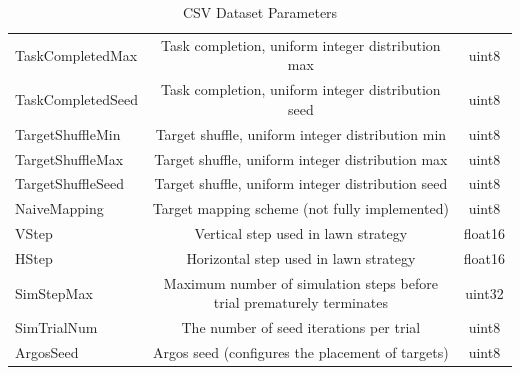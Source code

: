\documentclass{report}
\begin{document}
\begin{appendices}
\begin{table}
\begin{center}
\begin{tabular}{|l|c|c|}
			TaskCompletedMax & Task completion, uniform integer distribution max & uint8 \\
			TaskCompletedSeed & Task completion, uniform integer distribution seed & uint8 \\
			TargetShuffleMin & Target shuffle, uniform integer distribution min & uint8 \\
			TargetShuffleMax & Target shuffle, uniform integer distribution max & uint8 \\
			TargetShuffleSeed & Target shuffle, uniform integer distribution seed & uint8 \\
			NaiveMapping & Target mapping scheme (not fully implemented) & uint8 \\
			VStep & Vertical step used in lawn strategy & float16 \\
			HStep & Horizontal step used in lawn strategy & float16 \\
			SimStepMax & Maximum number of simulation steps before trial prematurely terminates & uint32 \\
			SimTrialNum & The number of seed iterations per trial & uint8 \\
			ArgosSeed  & Argos seed (configures the placement of targets) & uint8 \\
			\hline
		\end{tabular}
	\end{center}
	\caption{CSV Dataset Parameters}\label{tab:csv_params}
\end{table}


\end{appendices}
\end{document}
